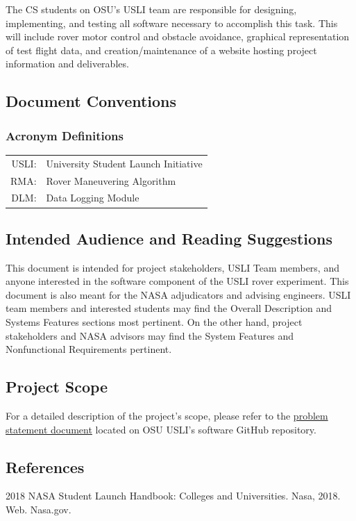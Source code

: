 \documentclass[onecolumn, draftclsnofoot, 10pt, compsoc]{IEEEtran}
\begin{document}
The CS students on OSU's USLI team are responsible for designing, implementing, and testing all software necessary to accomplish this task. 
This will include rover motor control and obstacle avoidance, graphical representation of test flight data, and creation/maintenance of a website hosting project information and deliverables.

\subsection{Document Conventions}
\subsubsection{Acronym Definitions}
\begin{tabular}{rl}
USLI: & University Student Launch Initiative\\
RMA: & Rover Maneuvering Algorithm \\
DLM: & Data Logging Module\\
\end{tabular}

\subsection{Intended Audience and Reading Suggestions}
This document is intended for project stakeholders, USLI Team members, and anyone interested in the software component of the USLI rover experiment. This document is also meant for the NASA adjudicators and advising engineers. USLI team members and interested students may find the Overall Description and Systems Features sections most pertinent. On the other hand, project stakeholders and NASA advisors may find the System Features and Nonfunctional Requirements pertinent.

\subsection{Project Scope}
For a detailed description of the project's scope, please refer to the \href{https://github.com/OSU-USLI-18/Payload-Software/tree/master/capstone-documentation/33_problem_statement}{problem statement document} located on OSU USLI's software GitHub repository.

\subsection{References}
2018 NASA Student Launch Handbook: Colleges and Universities. Nasa, 2018. Web. Nasa.gov.
\end{document}
